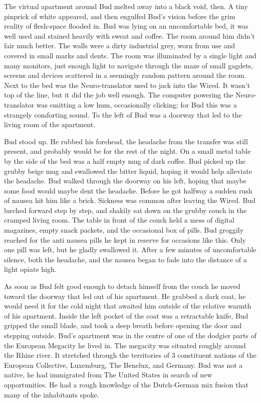 \documentclass{book}
\begin{document}
The virtual apartment around Bud melted away into a black void, then. A tiny pinprick of white appeared, and then engulfed Bud's vision before the grim reality of flesh-space flooded in. Bud was lying on an uncomfortable bed, it was well used and stained heavily with sweat and coffee. The room around him didn't fair much better. The walls were a dirty industrial grey, worn from use and covered in small marks and dents. The room was illuminated by a single light and many monitors, just enough light to navigate through the maze of small gagdets, screens and devices scattered in a seemingly random pattern around the room. Next to the bed was the Neuro-translator used to jack into the Wired. It wasn't top of the line, but it did the job well enough. The computer powering the Neuro-translator was emitting a low hum, occasionally clicking; for Bud this was a strangely comforting sound. To the left of Bud was a doorway that led to the living room of the apartment.

Bud stood up. He rubbed his forehead, the headache from the transfer was still present, and probably would be for the rest of the night. On a small metal table by the side of the bed was a half empty mug of dark coffee. Bud picked up the grubby beige mug and swallowed the bitter liquid, hoping it would help alleviate the headache. Bud walked through the doorway on his left, hoping that maybe some food would maybe dent the headache. Before he got halfway a sudden rush of nausea hit him like a brick. Sickness was common after leaving the Wired. Bud lurched forward step by step, and shakily sat down on the grubby couch in the cramped living room. The table in front of the couch held a mess of digital magazines, empty snack packets, and the occasional box of pills. Bud groggily reached for the anti nausea pills he kept in reserve for occasions like this. Only one pill was left, but he gladly swallowed it. After a few minutes of uncomfortable silence, both the headache, and the nausea began to fade into the distance of a light opiate high.

As soon as Bud felt good enough to detach himself from the couch he moved toward the doorway that led out of his apartment. He grabbed a dark coat, he would need it for the cold night that awaited him outside of the relative warmth of his apartment. Inside the left pocket of the coat was a retractable knife, Bud gripped the small blade, and took a deep breath before opening the door and stepping outside. Bud's apartment was in the centre of one of the dodgier parts of the European Megacity he lived in. The megacity was situated roughly around the Rhine river. It stretched through the territories of 3 constituent nations of the European Collective, Luxemburg, The Benelux, and Germany. Bud was not a native, he had immigrated from The United States in search of new opportunities. He had a rough knowledge of the Dutch-German mix fusion that many of the inhabitants spoke.
\end{document}
